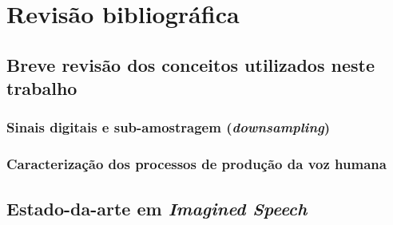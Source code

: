\chapter{Revisão bibliográfica} \label{chap:revBibli}
	\section{Breve revisão dos conceitos utilizados neste trabalho}

		\subsection{Sinais digitais e sub-amostragem (\textit{downsampling})}
			
		\subsection{Caracterização dos processos de produção da voz humana}
		
	\section{Estado-da-arte em \textit{Imagined Speech}}